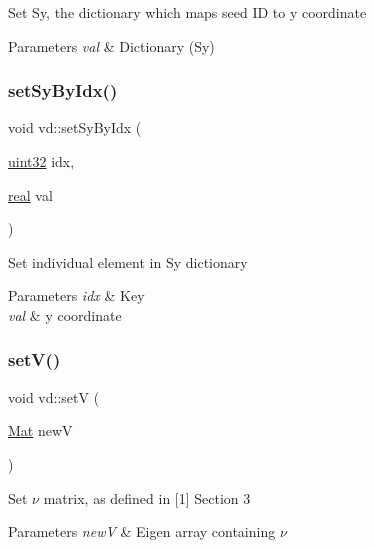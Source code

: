 Set Sy, the dictionary which maps seed ID to y coordinate 
\begin{DoxyParams}{Parameters}
{\em val} & Dictionary (Sy) \\
\hline
\end{DoxyParams}
\mbox{\label{classvd_a5407f9c20ed4ff2300ccbebb999d1dde}} 
\subsubsection{\texorpdfstring{set\+Sy\+By\+Idx()}{setSyByIdx()}}
{\footnotesize\ttfamily void vd\+::set\+Sy\+By\+Idx (\begin{DoxyParamCaption}\item[{\mbox{\hyperlink{typedefs_8cpp_a8ad23e2333787a214e20a58a284a5a60}{uint32}}}]{idx,  }\item[{\mbox{\hyperlink{typedefs_8cpp_a58a0c7cf2501f4492da833421be92547}{real}}}]{val }\end{DoxyParamCaption})}

Set individual element in Sy dictionary 
\begin{DoxyParams}{Parameters}
{\em idx} & Key \\
\hline
{\em val} & y coordinate \\
\hline
\end{DoxyParams}
\mbox{\label{classvd_a33e792915ebd0295a3475fe686b41ee9}} 
\subsubsection{\texorpdfstring{set\+V()}{setV()}}
{\footnotesize\ttfamily void vd\+::setV (\begin{DoxyParamCaption}\item[{\mbox{\hyperlink{typedefs_8cpp_a9fa28c1f74e909474857584f5c7b0088}{Mat}}}]{newV }\end{DoxyParamCaption})}

Set $\nu$ matrix, as defined in \mbox{[}1\mbox{]} Section 3 
\begin{DoxyParams}{Parameters}
{\em newV} & Eigen array containing $\nu$ \\
\hline
\end{DoxyParams}
\mbox{\label{classvd_a29670919bb8d5b2f2f0235ddfda6484e}} 
